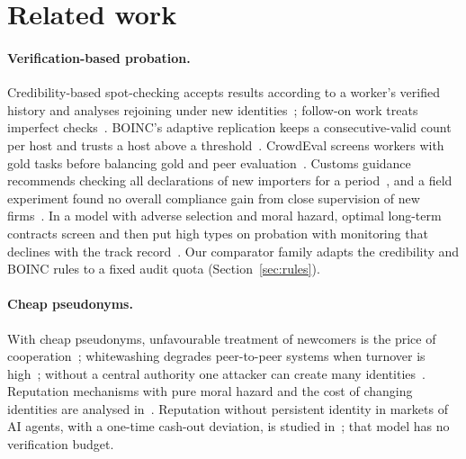 \documentclass[11pt]{article}
\begin{document}
\section{Related work}\label{sec:related}
\paragraph{Verification-based probation.} Credibility-based spot-checking accepts results according to a worker's verified history and analyses rejoining under new identities~\cite{sarmenta2001ccgrid,sarmenta2001sabotage}; follow-on work treats imperfect checks~\cite{watanabe2010generalized}. BOINC's adaptive replication keeps a consecutive-valid count per host and trusts a host above a threshold~\cite{anderson2009diversity,boincwiki}. CrowdEval screens workers with gold tasks before balancing gold and peer evaluation~\cite{qiu2018crowdeval}. Customs guidance recommends checking all declarations of new importers for a period~\cite{walsh2003postrelease}, and a field experiment found no overall compliance gain from close supervision of new firms~\cite{gangl2014supervision}. In a model with adverse selection and moral hazard, optimal long-term contracts screen and then put high types on probation with monitoring that declines with the track record~\cite{bhaskar2025screening}. Our comparator family adapts the credibility and BOINC rules to a fixed audit quota (Section~\ref{sec:rules}).

\paragraph{Cheap pseudonyms.} With cheap pseudonyms, unfavourable treatment of newcomers is the price of cooperation~\cite{friedman2001social}; whitewashing degrades peer-to-peer systems when turnover is high~\cite{feldman2006free}; without a central authority one attacker can create many identities~\cite{douceur2002sybil}. Reputation mechanisms with pure moral hazard and the cost of changing identities are analysed in~\cite{dellarocas2005reputation}. Reputation without persistent identity in markets of AI agents, with a one-time cash-out deviation, is studied in~\cite{gatta2026tempting}; that model has no verification budget.
\end{document}
